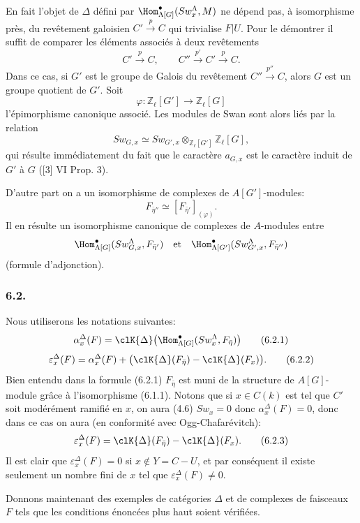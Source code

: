 En fait l'objet de $\Delta$ défini par $\Hom^\bullet_{\Lambda[G]}(Sw_x^\Lambda,M)$ ne dépend pas, à isomorphisme près, du revêtement galoisien $C'\xrightarrow{p}C$ qui trivialise $F|U$. Pour le démontrer il suffit de comparer les éléments associés à deux revêtements
\[
C'\xrightarrow{p}C,\qquad C''\xrightarrow{p'}C'\xrightarrow{p}C.
\]
Dans ce cas, si $G'$ est le groupe de Galois du revêtement $C''\xrightarrow{p''}C$, alors $G$ est un groupe quotient de $G'$. Soit
\[
\varphi:\mathbb{Z}_\ell[G']\longrightarrow \mathbb{Z}_\ell[G]
\]
l'épimorphisme canonique associé. Les modules de Swan sont alors liés par la relation
\[
Sw_{G,x}\simeq Sw_{G',x}\otimes_{\mathbb{Z}_\ell[G']}\mathbb{Z}_\ell[G],
\]
qui résulte immédiatement du
fait que le caractère $a_{G,x}$ est le caractère induit de $G'$ à $G$ ([3] VI Prop. 3).

D'autre part on a un isomorphisme de complexes de $A[G']$-modules:
\[
F_{\bar\eta''}\simeq [F_{\bar\eta'}]_{(\varphi)}.
\]
Il en résulte un isomorphisme canonique de complexes de $A$-modules entre
\[
\Hom^\bullet_{\Lambda[G]}(Sw_{G,x}^\Lambda,F_{\bar\eta'})
\quad\text{et}\quad
\Hom^\bullet_{\Lambda[G']}(Sw_{G',x}^\Lambda,F_{\bar\eta''})
\]
(formule d'adjonction).

\subsubsection*{6.2.}

Nous utiliserons les notations suivantes:
\[
\alpha_x^\Delta(F)
=
\clK{\Delta}\bigl(\Hom^\bullet_{\Lambda[G]}(Sw_x^\Lambda,F_{\bar\eta})\bigr)
\tag{6.2.1}
\]
\[
\varepsilon_x^\Delta(F)
=
\alpha_x^\Delta(F)+
\bigl(\clK{\Delta}(F_{\bar\eta})-\clK{\Delta}(F_x)\bigr).
\tag{6.2.2}
\]
Bien entendu dans la formule (6.2.1) $F_{\bar\eta}$ est muni de la structure de $A[G]$-module grâce à l'isomorphisme (6.1.1). Notons que si $x\in C(k)$ est tel que $C'$ soit modérément ramifié en $x$, on aura (4.6) $Sw_x=0$ donc $\alpha_x^\Delta(F)=0$, donc dans ce cas on aura (en conformité avec Ogg-Chafarévitch):
\[
\varepsilon_x^\Delta(F)=\clK{\Delta}(F_{\bar\eta})-\clK{\Delta}(F_x).
\tag{6.2.3}
\]
Il est clair que $\varepsilon_x^\Delta(F)=0$ si $x\notin Y=C-U$, et par conséquent il existe seulement un nombre fini de $x$ tel que $\varepsilon_x^\Delta(F)\ne0$.

Donnons maintenant des exemples de catégories $\Delta$ et de complexes de faisceaux $F$ tels que les conditions énoncées plus haut soient vérifiées.

